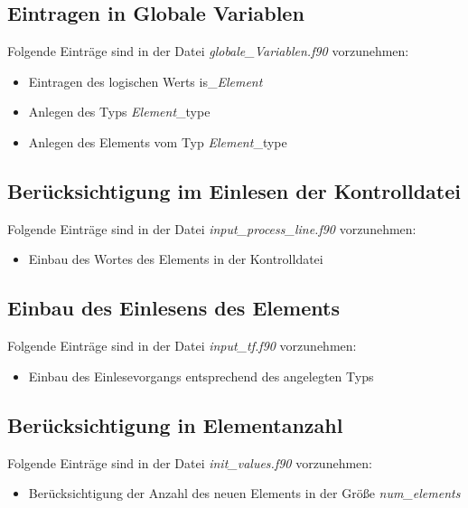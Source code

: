 \documentclass[11pt,titlepage,listof=totoc,bibliography=totoc,twoside]{scrreprt}
\begin{document}
{{\subsection{Eintragen in Globale Variablen}

Folgende Einträge sind in der Datei \emph{globale\_Variablen.f90} vorzunehmen:

\begin{itemize}
\item Eintragen des logischen Werts is\_\emph{Element}
\item Anlegen des Typs \emph{Element}\_type
\item Anlegen des Elements vom Typ \emph{Element}\_type
\end{itemize}

\subsection{Berücksichtigung im Einlesen der Kontrolldatei}

Folgende Einträge sind in der Datei \emph{input\_process\_line.f90} vorzunehmen:

\begin{itemize}
\item Einbau des Wortes des Elements in der Kontrolldatei
\end{itemize}

\subsection{Einbau des Einlesens des Elements}

Folgende Einträge sind in der Datei \emph{input\_tf.f90} vorzunehmen:

\begin{itemize}
\item Einbau des Einlesevorgangs entsprechend des angelegten Typs
\end{itemize}

\subsection{Berücksichtigung in Elementanzahl}

Folgende Einträge sind in der Datei \emph{init\_values.f90} vorzunehmen:

\begin{itemize}
\item Berücksichtigung der Anzahl des neuen Elements in der Größe \emph{num\_elements}
\end{itemize}

}}
\end{document}
